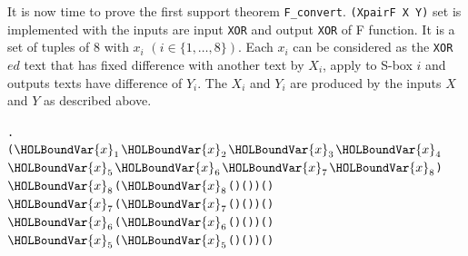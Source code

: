 \documentclass{article}
\begin{document}
It is now time to prove the first support theorem \verb|F_convert|. \verb|(XpairF X Y)| set is implemented
with the inputs are input \verb|XOR| and output \verb|XOR| of F function. It is a set of tuples of 8 with $x_i$ $(i \in \{1, \dots, 8\})$.
Each $x_i$ can be considered as the \verb|XOR|$ed$ text that has fixed difference with another text by $X_i$, apply to S-box $i$
and outputs texts have difference of $Y_i$. The $X_i$ and $Y_i$ are produced by the inputs $X$ and $Y$ as described above.

\begin{alltt}
\HOLTokenTurnstile{} \HOLSymConst{\HOLTokenForall{}} .
        \HOLSymConst{=}
     \HOLTokenLeftbrace{}(\ensuremath{\HOLBoundVar{x}\sb{\mathrm{1}}}\HOLSymConst{,}\ensuremath{\HOLBoundVar{x}\sb{\mathrm{2}}}\HOLSymConst{,}\ensuremath{\HOLBoundVar{x}\sb{\mathrm{3}}}\HOLSymConst{,}\ensuremath{\HOLBoundVar{x}\sb{\mathrm{4}}}\HOLSymConst{,}\ensuremath{\HOLBoundVar{x}\sb{\mathrm{5}}}\HOLSymConst{,}\ensuremath{\HOLBoundVar{x}\sb{\mathrm{6}}}\HOLSymConst{,}\ensuremath{\HOLBoundVar{x}\sb{\mathrm{7}}}\HOLSymConst{,}\ensuremath{\HOLBoundVar{x}\sb{\mathrm{8}}}) \HOLTokenBar{}
       \ensuremath{\HOLBoundVar{x}\sb{\mathrm{8}}} \HOLSymConst{\HOLTokenEor{}}  (\ensuremath{\HOLBoundVar{x}\sb{\mathrm{8}}} \HOLSymConst{\HOLTokenEor{}} ( \HOLSymConst{\HOLTokenExtract{}} ) ( )) \HOLSymConst{=} ( \HOLSymConst{\HOLTokenExtract{}} )  \HOLSymConst{\HOLTokenConj{}}
       \ensuremath{\HOLBoundVar{x}\sb{\mathrm{7}}} \HOLSymConst{\HOLTokenEor{}}  (\ensuremath{\HOLBoundVar{x}\sb{\mathrm{7}}} \HOLSymConst{\HOLTokenEor{}} ( \HOLSymConst{\HOLTokenExtract{}} ) ( )) \HOLSymConst{=} ( \HOLSymConst{\HOLTokenExtract{}} )  \HOLSymConst{\HOLTokenConj{}}
       \ensuremath{\HOLBoundVar{x}\sb{\mathrm{6}}} \HOLSymConst{\HOLTokenEor{}}  (\ensuremath{\HOLBoundVar{x}\sb{\mathrm{6}}} \HOLSymConst{\HOLTokenEor{}} ( \HOLSymConst{\HOLTokenExtract{}} ) ( )) \HOLSymConst{=} ( \HOLSymConst{\HOLTokenExtract{}} )  \HOLSymConst{\HOLTokenConj{}}
       \ensuremath{\HOLBoundVar{x}\sb{\mathrm{5}}} \HOLSymConst{\HOLTokenEor{}}  (\ensuremath{\HOLBoundVar{x}\sb{\mathrm{5}}} \HOLSymConst{\HOLTokenEor{}} ( \HOLSymConst{\HOLTokenExtract{}} ) ( )) \HOLSymConst{=} ( \HOLSymConst{\HOLTokenExtract{}} )  \HOLSymConst{\HOLTokenConj{}}

\end{alltt}
\end{document}
